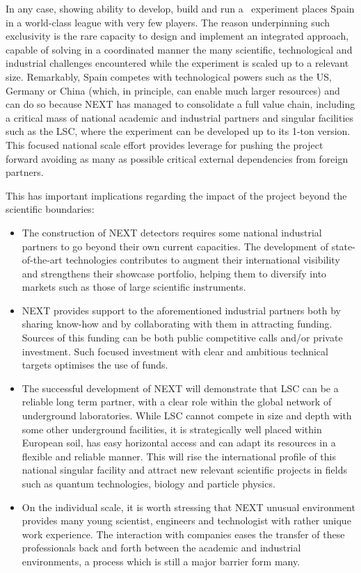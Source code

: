 In any case, showing ability to develop, build and run a \bbonu\ experiment places Spain in a world-class league with very few players. The reason underpinning such exclusivity is the rare capacity to design and implement an integrated approach, capable of solving in a coordinated manner the many scientific, technological and industrial challenges encountered while the experiment is scaled up to a relevant size. Remarkably, Spain competes with technological powers such as the US, Germany or China (which, in principle, can enable much larger resources) and can do so because NEXT has managed to consolidate a full value chain, including a critical mass of national academic and industrial partners and singular facilities such as the LSC, where the experiment can be developed up to its 1-ton version. This focused national scale effort provides leverage for pushing the project forward avoiding as many as possible critical external dependencies from foreign partners.  

This has important implications regarding the impact of the project beyond the scientific boundaries:
\begin{itemize}
\item The construction of NEXT detectors requires some national industrial partners to go beyond their own current capacities. The development of state-of-the-art technologies contributes to augment their international visibility and strengthens their showcase portfolio, helping them to diversify into markets such as those of large scientific instruments. 
\item  NEXT provides support to the aforementioned industrial partners both by sharing know-how and by collaborating with them in attracting funding. Sources of this funding can be both public competitive calls and/or private investment. Such focused investment with clear and ambitious technical targets optimises the use of funds.  
\item The successful development of NEXT will demonstrate that LSC can be a reliable long term partner, with a clear role within the global network of underground laboratories. While LSC cannot compete in size and depth with some other underground facilities, it is strategically well placed within European soil, has easy horizontal access and can adapt its resources in a flexible and reliable manner. This will rise the international profile of this national singular facility and attract new relevant scientific projects in fields such as quantum technologies, biology and particle physics. 
\item On the individual scale, it is worth stressing that NEXT unusual environment provides many young scientist, engineers and technologist with rather unique work experience. The interaction with companies eases the transfer of these professionals back and forth  between the academic and industrial environments, a process which is still a major barrier form many. 
\end{itemize}

